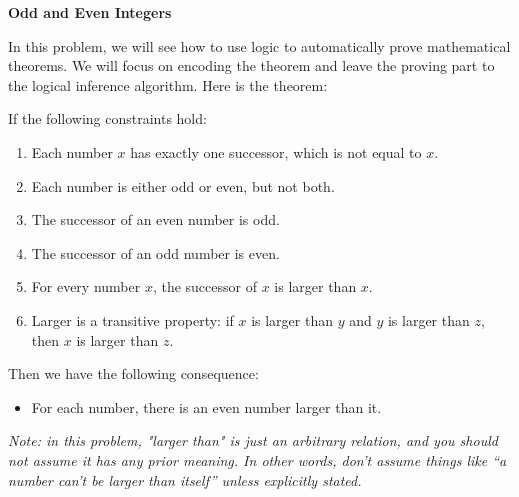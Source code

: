 \item {\bf Odd and Even Integers}

In this problem, we will see how to use logic to automatically prove
mathematical theorems.  We will focus on encoding the theorem and leave the
proving part to the logical inference algorithm. Here is the theorem:

If the following constraints hold:
\begin{enumerate}[label=\arabic*., itemsep=0em]
   \item Each number $x$ has exactly one successor, which is not equal to $x$.
   \item Each number is either odd or even, but not both.
   \item The successor of an even number is odd.
   \item The successor of an odd number is even.
   \item For every number $x$, the successor of $x$ is larger than $x$.
   \item Larger is a transitive property: if $x$ is larger than $y$ and $y$ is
        larger than $z$, then $x$ is larger than $z$.
\end{enumerate}
Then we have the following consequence:
\begin{itemize}
  \item For each number, there is an even number larger than it.
\end{itemize}

{\em Note: in this problem, "larger than" is just an arbitrary relation, and you
should not assume it has any prior meaning.  In other words, don't assume things
like ``a number can't be larger than itself'' unless explicitly stated.}

\begin{enumerate}

  

\end{enumerate}

